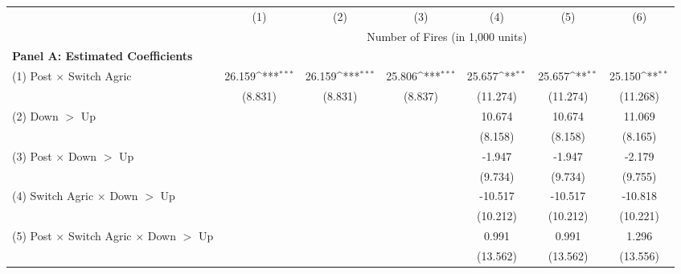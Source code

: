 {
\def\sym#1{\ifmmode^{#1}\else\(^{#1}\)\fi}
\begin{tabular}{l*{6}{c}}
\hline
            &\multicolumn{1}{c}{(1)}         &\multicolumn{1}{c}{(2)}         &\multicolumn{1}{c}{(3)}         &\multicolumn{1}{c}{(4)}         &\multicolumn{1}{c}{(5)}         &\multicolumn{1}{c}{(6)}         \\
            & \multicolumn{6}{c}{Number of Fires (in 1,000 units)} \\ \hline
\multicolumn{7}{l}{\textbf{Panel A: Estimated Coefficients}} \\ \hline
(1) Post $\times$ Switch Agric&      26.159\sym{***}&      26.159\sym{***}&      25.806\sym{***}&      25.657\sym{**} &      25.657\sym{**} &      25.150\sym{**} \\
            &     (8.831)         &     (8.831)         &     (8.837)         &    (11.274)         &    (11.274)         &    (11.268)         \\
(2) Down $>$ Up&                     &                     &                     &      10.674         &      10.674         &      11.069         \\
            &                     &                     &                     &     (8.158)         &     (8.158)         &     (8.165)         \\
(3) Post $\times$ Down $>$ Up&                     &                     &                     &      -1.947         &      -1.947         &      -2.179         \\
            &                     &                     &                     &     (9.734)         &     (9.734)         &     (9.755)         \\
(4) Switch Agric  $\times$ Down $>$ Up&                     &                     &                     &     -10.517         &     -10.517         &     -10.818         \\
            &                     &                     &                     &    (10.212)         &    (10.212)         &    (10.221)         \\
(5) Post $\times$ Switch Agric  $\times$ Down $>$ Up&                     &                     &                     &       0.991         &       0.991         &       1.296         \\
            &                     &                     &                     &    (13.562)         &    (13.562)         &    (13.556)         \\





\end{tabular}}
